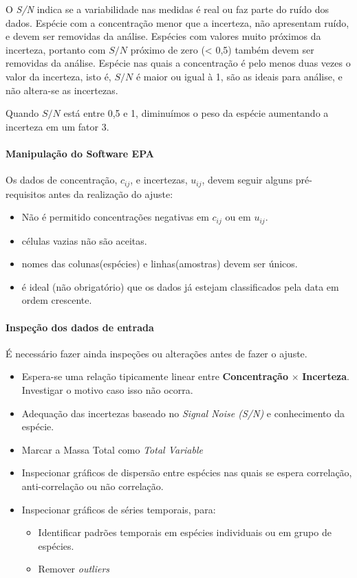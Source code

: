 O \textit{S/N} indica se a variabilidade nas medidas é real ou faz parte do 
ruído dos dados. 
Espécie com a concentração menor que a incerteza, não apresentam ruído, e devem 
ser removidas da análise. Espécies com valores muito próximos da incerteza, 
portanto com $S/N$ próximo de zero (< 0,5) também devem ser removidas da 
análise. 
Espécie nas quais a concentração é pelo menos duas vezes o valor da incerteza, 
isto é, $S/N$ é maior ou igual à 1, são as ideais para análise, 
e não altera-se as incertezas. 

Quando $S/N$ está entre 0,5 e 1, diminuímos o peso da espécie aumentando a 
incerteza em um fator 3.  

\paragraph{Manipulação do Software EPA}

Os dados de concentração, $c_{ij}$, e incertezas, $u_{ij}$, devem seguir 
alguns pré-requisitos antes da realização do ajuste:

\begin{itemize}
  \item Não é permitido concentrações negativas em $c_{ij}$ ou em $u_{ij}$.
  \item células vazias não são aceitas.
  \item nomes das colunas(espécies) e linhas(amostras) devem ser únicos.
  \item é ideal (não obrigatório) que os dados já estejam classificados 
        pela data em ordem crescente.
\end{itemize}

\paragraph{Inspeção dos dados de entrada}

É necessário fazer ainda inspeções ou alterações antes de fazer o ajuste.
\begin{itemize}
  \item Espera-se uma relação tipicamente linear entre 
        \textbf{Concentração} $\times$ \textbf{Incerteza}.  
        Investigar o motivo caso isso não ocorra. 
  \item Adequação das incertezas baseado no \textit{Signal Noise (S/N)} e 
        conhecimento da espécie. 
  \item Marcar a Massa Total como \textit{Total Variable}
  \item Inspecionar gráficos de dispersão entre espécies nas quais se espera 
        correlação, anti-correlação ou não correlação. 
  \item Inspecionar gráficos de séries temporais, para:
    \begin{itemize}
      \item Identificar padrões temporais em espécies individuais ou em grupo 
            de espécies.
      \item Remover \textit{outliers} 
    \end{itemize}
\end{itemize}

